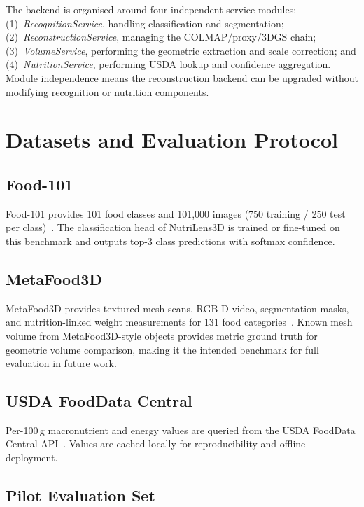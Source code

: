 \documentclass[conference]{IEEEtran}
\begin{document}
The backend is organised around four independent service modules:
(1)~\textit{RecognitionService}, handling classification and segmentation;
(2)~\textit{ReconstructionService}, managing the COLMAP/proxy/3DGS chain;
(3)~\textit{VolumeService}, performing the geometric extraction and scale
correction; and (4)~\textit{NutritionService}, performing USDA lookup and
confidence aggregation. Module independence means the reconstruction backend
can be upgraded without modifying recognition or nutrition components.

\section{Datasets and Evaluation Protocol}
\label{sec:experiments}

\subsection{Food-101}

Food-101 provides 101 food classes and 101{,}000 images (750 training /
250 test per class)~\cite{bossard2014food101}. The classification head of
NutriLens3D is trained or fine-tuned on this benchmark and outputs top-3
class predictions with softmax confidence.

\subsection{MetaFood3D}

MetaFood3D provides textured mesh scans, RGB-D video, segmentation masks,
and nutrition-linked weight measurements for 131 food
categories~\cite{chen2024metafood3d}. Known mesh volume from MetaFood3D-style
objects provides metric ground truth for geometric volume comparison,
making it the intended benchmark for full evaluation in future work.

\subsection{USDA FoodData Central}

Per-100\,g macronutrient and energy values are queried from the USDA
FoodData Central API~\cite{usda2019fdc, haytowitz2019fdc}. Values are cached
locally for reproducibility and offline deployment.

\subsection{Pilot Evaluation Set}
\end{document}
